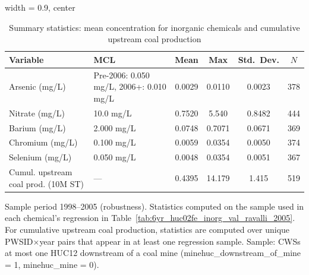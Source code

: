 
\begin{table}[htbp]
   \caption{\label{tab:6yr_huc02fe_inorg_val_sumstats_ravalli_2005} Summary statistics: mean concentration for inorganic chemicals and cumulative upstream coal production}
   \bigskip
   \centering
   \begin{adjustbox}{width = 0.9\textwidth, center}
      \begin{tabular}{lp{3.8cm}cccc}
         \toprule
         Variable & MCL & Mean & Max & Std.\ Dev. & $N$ \\
         \midrule
         Arsenic (mg/L) & Pre-2006: 0.050 mg/L, 2006+: 0.010 mg/L & 0.0029 & 0.0110 & 0.0023 & 378 \\
         Nitrate (mg/L) & 10.0 mg/L & 0.7520 & 5.540 & 0.8482 & 444 \\
         Barium (mg/L) & 2.000 mg/L & 0.0748 & 0.7071 & 0.0671 & 369 \\
         Chromium (mg/L) & 0.100 mg/L & 0.0059 & 0.0354 & 0.0050 & 374 \\
         Selenium (mg/L) & 0.050 mg/L & 0.0048 & 0.0354 & 0.0051 & 367 \\
         Cumul. upstream coal prod. (10M ST) & --- & 0.4395 & 14.179 & 1.415 & 519 \\
         \bottomrule
      \end{tabular}
   \end{adjustbox}
   {\tiny\linespread{1}\selectfont \par \raggedright Sample period 1998--2005 (robustness). Statistics computed on the sample used in each chemical's regression in Table~\ref{tab:6yr_huc02fe_inorg_val_ravalli_2005}. For cumulative upstream coal production, statistics are computed over unique PWSID$\times$year pairs that appear in at least one regression sample. Sample: CWSs at most one HUC12 downstream of a coal mine (minehuc\_downstream\_of\_mine = 1, minehuc\_mine = 0).}
\end{table}


